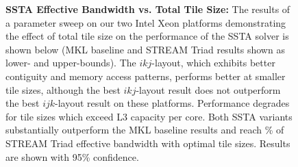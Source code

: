 \documentclass[10pt, conference, compsocconf]{IEEEtran}
\newcommand{\textapprox}{\texttildelow}
\begin{document}
\begin{figure}[!bth]
  \centering
  \caption{\small
    \textbf{SSTA Effective Bandwidth vs. Total Tile Size:}
    The results of a parameter sweep on our two Intel Xeon platforms
      demonstrating the effect of total tile size on the performance of the
      SSTA solver is shown below (MKL baseline and STREAM Triad results shown as
      lower- and upper-bounds).
    The \(ikj\)-layout, which exhibits better contiguity and memory access
      patterns, performs better at smaller tile sizes, although the best
      \(ikj\)-layout result does not outperform the best \(ijk\)-layout result
      on these platforms.
    Performance degrades for tile sizes which exceed L3 capacity per core.
    Both SSTA variants substantially outperform the MKL baseline results and 
      reach \textapprox 90\% of STREAM Triad effective bandwidth with optimal 
      tile sizes.
    Results are shown with 95\% confidence.
  }
  \label{fig:results:bw_vs_tile_size_xeon}
  \begin{minipage}{0.49\textwidth}
  \end{minipage}
  \begin{minipage}{0.49\textwidth}
  \end{minipage}
\end{figure}
\end{document}

